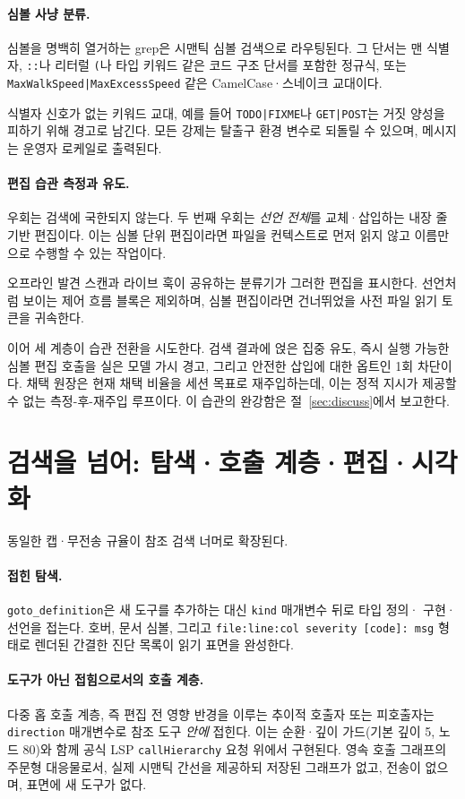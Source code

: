 \documentclass[11pt]{article}
\begin{document}
\paragraph{심볼 사냥 분류.}
심볼을 명백히 열거하는 grep은 시맨틱 심볼 검색으로 라우팅된다. 그 단서는 맨 식별자,
\texttt{::}나 리터럴 \texttt{(}나 타입 키워드 같은 코드 구조 단서를 포함한 정규식, 또는
\texttt{MaxWalkSpeed|MaxExcessSpeed} 같은 CamelCase·스네이크 교대이다.

식별자 신호가 없는 키워드 교대, 예를 들어 \texttt{TODO|FIXME}나 \texttt{GET|POST}는 거짓
양성을 피하기 위해 경고로 남긴다. 모든 강제는 탈출구 환경 변수로 되돌릴 수 있으며, 메시지는
운영자 로케일로 출력된다.

\paragraph{편집 습관 측정과 유도.}
우회는 검색에 국한되지 않는다. 두 번째 우회는 \emph{선언 전체}를 교체·삽입하는 내장 줄 기반
편집이다. 이는 심볼 단위 편집이라면 파일을 컨텍스트로 먼저 읽지 않고 이름만으로 수행할 수 있는
작업이다.

오프라인 발견 스캔과 라이브 훅이 공유하는 분류기가 그러한 편집을 표시한다. 선언처럼 보이는
제어 흐름 블록은 제외하며, 심볼 편집이라면 건너뛰었을 사전 파일 읽기 토큰을 귀속한다.

이어 세 계층이 습관 전환을 시도한다. 검색 결과에 얹은 집중 유도, 즉시 실행 가능한 심볼 편집
호출을 실은 모델 가시 경고, 그리고 안전한 삽입에 대한 옵트인 1회 차단이다. 채택 원장은 현재
채택 비율을 세션 목표로 재주입하는데, 이는 정적 지시가 제공할 수 없는 측정-후-재주입 루프이다.
이 습관의 완강함은 절~\ref{sec:discuss}에서 보고한다.

\section{검색을 넘어: 탐색·호출 계층·편집·시각화}
\label{sec:beyond}

동일한 캡·무전송 규율이 참조 검색 너머로 확장된다.

\paragraph{접힌 탐색.}
\texttt{goto\_definition}은 새 도구를 추가하는 대신 \texttt{kind} 매개변수 뒤로 타입 정의·
구현·선언을 접는다. 호버, 문서 심볼, 그리고 \texttt{file:line:col severity [code]: msg}
형태로 렌더된 간결한 진단 목록이 읽기 표면을 완성한다.

\paragraph{도구가 아닌 접힘으로서의 호출 계층.}
다중 홉 호출 계층, 즉 편집 전 영향 반경을 이루는 추이적 호출자 또는 피호출자는
\texttt{direction} 매개변수로 참조 도구 \emph{안에} 접힌다. 이는 순환·깊이 가드(기본 깊이 5,
노드 80)와 함께 공식 LSP \texttt{callHierarchy} 요청 위에서 구현된다. 영속 호출 그래프의
주문형 대응물로서, 실제 시맨틱 간선을 제공하되 저장된 그래프가 없고, 전송이 없으며, 표면에 새
도구가 없다.
\end{document}

